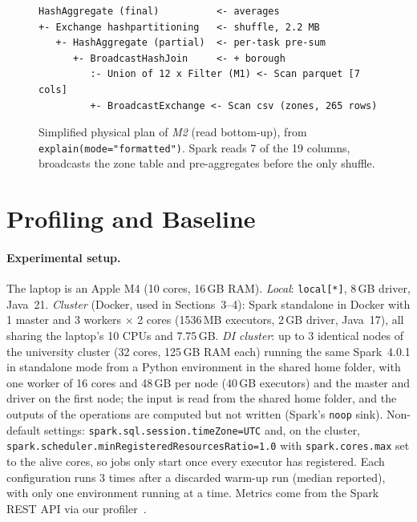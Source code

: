 \documentclass[10pt,a4paper]{article}
\begin{document}
\begin{figure}[!htb]
\centering
\begin{minipage}{0.52\linewidth}
\begin{Verbatim}[fontsize=\scriptsize]
HashAggregate (final)          <- averages
+- Exchange hashpartitioning   <- shuffle, 2.2 MB
   +- HashAggregate (partial)  <- per-task pre-sum
      +- BroadcastHashJoin     <- + borough
         :- Union of 12 x Filter (M1) <- Scan parquet [7 cols]
         +- BroadcastExchange <- Scan csv (zones, 265 rows)
\end{Verbatim}
\end{minipage}\hfill
\begin{minipage}{0.45\linewidth}
\caption{Simplified physical plan of \textit{M2} (read bottom-up), from \texttt{explain(mode="formatted")}. Spark reads 7 of the 19 columns, broadcasts the zone table and pre-aggregates before the only shuffle.}
\label{fig:plan}
\end{minipage}
\end{figure}

\section{Profiling and Baseline} \label{baseline}

\paragraph{Experimental setup.} The laptop is an Apple M4 (10 cores, 16\,GB RAM). \emph{Local}: \texttt{local[*]}, 8\,GB driver, Java~21. \emph{Cluster} (Docker, used in Sections~3--4): Spark standalone in Docker with 1 master and 3 workers $\times$ 2 cores (1536\,MB executors, 2\,GB driver, Java~17), all sharing the laptop's 10 CPUs and 7.75\,GB. \emph{DI cluster}: up to 3 identical nodes of the university cluster (32 cores, 125\,GB RAM each) running the same Spark~4.0.1 in standalone mode from a Python environment in the shared home folder, with one worker of 16 cores and 48\,GB per node (40\,GB executors) and the master and driver on the first node; the input is read from the shared home folder, and the outputs of the operations are computed but not written (Spark's \texttt{noop} sink). Non-default settings: \texttt{spark.sql.session.timeZone=UTC} and, on the cluster, \texttt{spark.scheduler.minRegisteredResourcesRatio=1.0} with \texttt{spark.cores.max} set to the alive cores, so jobs only start once every executor has registered. Each configuration runs 3 times after a discarded warm-up run (median reported), with only one environment running at a time. Metrics come from the Spark REST API via our profiler~\cite{spark-monitoring}.
\end{document}
